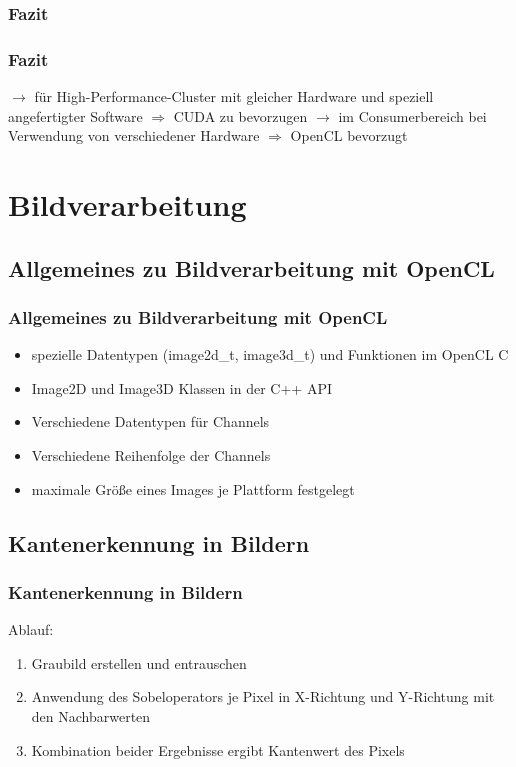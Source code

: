 \documentclass{beamer}
\begin{document}
\subsubsection*{Fazit}
\begin{frame}
\frametitle{Fazit}
$\to$
für High-Performance-Cluster mit gleicher Hardware und speziell angefertigter Software
\newline
$\Rightarrow$
CUDA zu bevorzugen
\newline
\newline
$\to$
im Consumerbereich bei Verwendung von verschiedener Hardware
\newline
$\Rightarrow$
OpenCL bevorzugt
\end{frame}

\section{Bildverarbeitung}

\subsection{Allgemeines zu Bildverarbeitung mit OpenCL}
\begin{frame}
\frametitle{Allgemeines zu Bildverarbeitung mit OpenCL}
\begin{itemize}
\item spezielle Datentypen (image2d\_t, image3d\_t) und Funktionen im OpenCL C
\item Image2D und Image3D Klassen in der C++ API
\item Verschiedene Datentypen für Channels
\item Verschiedene Reihenfolge der Channels
\item maximale Größe eines Images je Plattform festgelegt
\end{itemize}
\end{frame}

\subsection{Kantenerkennung in Bildern}
\begin{frame}
\frametitle{Kantenerkennung in Bildern}
Ablauf:
\begin{enumerate}
\item Graubild erstellen und entrauschen
\item Anwendung des Sobeloperators je Pixel in X-Richtung und Y-Richtung mit den Nachbarwerten
\item Kombination beider Ergebnisse ergibt Kantenwert des Pixels
\end{enumerate}
\end{frame}
\end{document}

